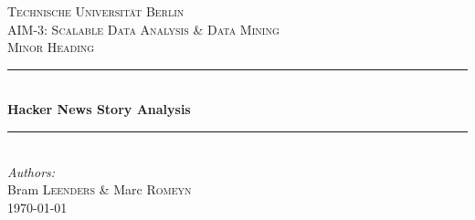 %
%

\begin{titlepage}

\newcommand{\HRule}{\rule{\linewidth}{0.5mm}} %

\center %
 
\textsc{\LARGE Technische Universit\"at Berlin}\\[1.5cm] %
\textsc{\Large AIM-3: Scalable Data Analysis \& Data Mining}\\[0.5cm] %
\textsc{\large Minor Heading}\\[0.5cm] %

\HRule \\[0.4cm]
{ \huge \bfseries Hacker News Story Analysis}\\[0.4cm] %

\HRule \\[1.5cm]
\Large \emph{Authors:}\\
Bram \textsc{Leenders} \& Marc \textsc{Romeyn}\\[3cm]


{\large \today}\\[3cm] 


\vfill %

\end{titlepage}
